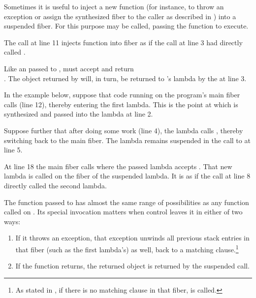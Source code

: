 \label{resumewith}
Sometimes it is useful to inject a new function (for instance, to throw an
exception or assign the synthesized fiber to the caller as described in
) into a suspended fiber. For this purpose
\anyresumewith may be called, passing the function  to execute.


The \resumewith call at line 11 injects function  into
fiber  as if the \resume call at line 3 had directly
called .

Like an \entryfn passed to \fiber,  must accept
 and return\\
\fiber. The \fiber object returned by  will, in turn, be returned
to 's lambda by the \resume at line 3.

In the example below, suppose that code running on the program's main fiber
calls \resume (line 12), thereby entering the first lambda. This is the point
at which  is synthesized and passed into the lambda at line 2.

Suppose further that after doing some work (line 4), the lambda calls
, thereby switching back to the main fiber. The lambda remains
suspended in the call to  at line 5.

At line 18 the main fiber calls  where the passed lambda
accepts . That new lambda is called on the fiber of the suspended
lambda. It is as if the  call at line 8 directly called the second
lambda.

The function passed to \resumewith has almost the same range of possibilities as
any function called on . Its special invocation
matters when control leaves it in either of two ways:

\begin{enumerate}
  \item If it throws an exception, that exception unwinds all previous stack
        entries in that fiber (such as the first lambda's) as well, back to
        a matching  clause.\footnote{As stated
        in , if there is no matching 
        clause in that fiber, \termn is called.}
  \item If the function returns, the returned \fiber object is returned by
        the suspended \anyresume call.
\end{enumerate}

